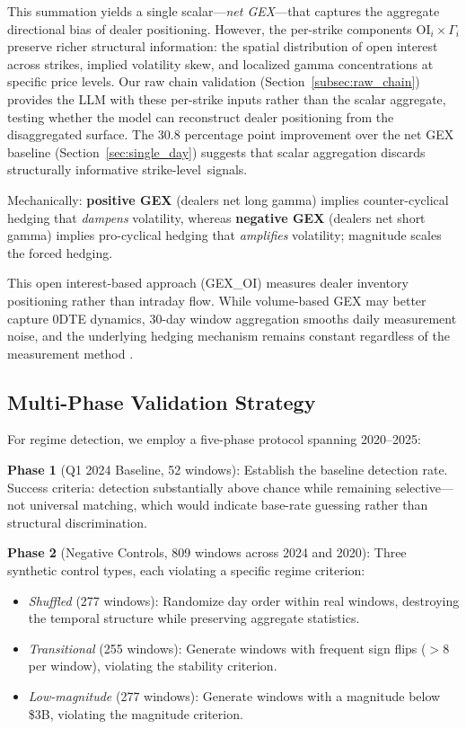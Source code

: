 \documentclass[jrfm,article,accept,moreauthors,pdftex]{Definitions/mdpi}
\begin{document}
This summation yields a single scalar---\textit{net GEX}---that captures the aggregate directional bias of dealer positioning. However, the per-strike components $\text{OI}_i \times \Gamma_i$ preserve richer structural information: the spatial distribution of open interest across strikes, implied volatility skew, and localized gamma concentrations at specific price levels. Our raw chain validation (Section~\ref{subsec:raw_chain}) provides the LLM with these per-strike inputs rather than the scalar aggregate, testing whether the model can reconstruct dealer positioning from the disaggregated surface. The 30.8 percentage point improvement over the net GEX baseline (Section~\ref{sec:single_day}) suggests that scalar aggregation discards structurally informative \mbox{strike-level signals.}

Mechanically: \textbf{positive GEX} (dealers net long gamma) implies counter-cyclical hedging that \textit{dampens} volatility, whereas \textbf{negative GEX} (dealers net short gamma) implies pro-cyclical hedging that \textit{amplifies} volatility; magnitude scales the forced hedging.

This open interest-based approach (GEX\_OI) measures dealer inventory positioning rather than intraday flow. While volume-based GEX may better capture 0DTE dynamics, \mbox{30-day} window aggregation smooths daily measurement noise, and the underlying hedging mechanism remains constant regardless of the measurement method \citep{adams2025zerodte}.

\subsection{Multi-Phase Validation Strategy}

For regime detection, we employ a five-phase protocol spanning 2020--2025:

\textbf{Phase 1} (Q1 2024 Baseline, 52 windows): Establish the baseline detection rate. Success criteria: detection substantially above chance while remaining selective---not universal matching, which would indicate base-rate guessing rather than structural discrimination.

\textbf{Phase 2} (Negative Controls, 809 windows across 2024 and 2020): Three synthetic control types, each violating a specific regime criterion:
\begin{itemize}
    \item \textit{Shuffled} (277 windows): Randomize day order within real windows, destroying the temporal structure while preserving aggregate statistics.
    \item \textit{Transitional} (255 windows): Generate windows with frequent sign flips ($>$8 per window), violating the stability criterion.
    \item \textit{Low-magnitude} (277 windows): Generate windows with a magnitude below \$3B, violating the magnitude criterion.
\end{itemize}
\end{document}
